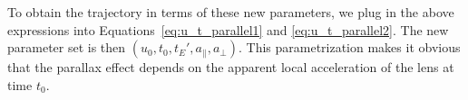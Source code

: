 \documentclass[11pt]{report}
\begin{document}
To obtain the trajectory in terms of these new parameters, we plug in the above expressions
into Equations~\ref{eq:u_t_parallel1} and \ref{eq:u_t_parallel2}.
The new parameter set is then $\left(u_0,t_0,t_E',a_\parallel,a_\bot\right)$. This parametrization makes it obvious that the parallax
effect depends on the apparent local acceleration of the lens at time $t_0$.


\end{document}
